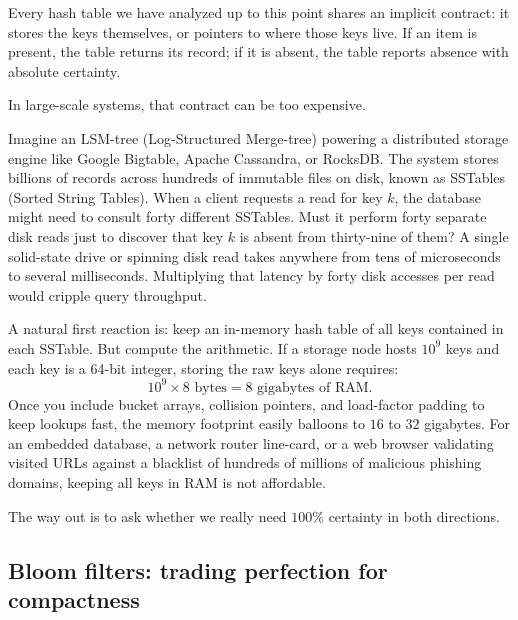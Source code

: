 Every hash table we have analyzed up to this point shares an implicit contract: it stores the keys themselves, or pointers to where those keys live. If an item is present, the table returns its record; if it is absent, the table reports absence with absolute certainty.

In large-scale systems, that contract can be too expensive.

Imagine an LSM-tree (Log-Structured Merge-tree) powering a distributed storage engine like Google Bigtable, Apache Cassandra, or RocksDB. The system stores billions of records across hundreds of immutable files on disk, known as SSTables (Sorted String Tables). When a client requests a read for key $k$, the database might need to consult forty different SSTables. Must it perform forty separate disk reads just to discover that key $k$ is absent from thirty-nine of them? A single solid-state drive or spinning disk read takes anywhere from tens of microseconds to several milliseconds. Multiplying that latency by forty disk accesses per read would cripple query throughput.

A natural first reaction is: keep an in-memory hash table of all keys contained in each SSTable. But compute the arithmetic. If a storage node hosts $10^9$ keys and each key is a 64-bit integer, storing the raw keys alone requires:
\[
  10^9 \times 8\text{ bytes} = 8\text{ gigabytes of RAM}.
\]
Once you include bucket arrays, collision pointers, and load-factor padding to keep lookups fast, the memory footprint easily balloons to $16$ to $32$ gigabytes. For an embedded database, a network router line-card, or a web browser validating visited URLs against a blacklist of hundreds of millions of malicious phishing domains, keeping all keys in RAM is not affordable.

The way out is to ask whether we really need $100\%$ certainty in both directions.

\subsection{Bloom filters: trading perfection for compactness}

